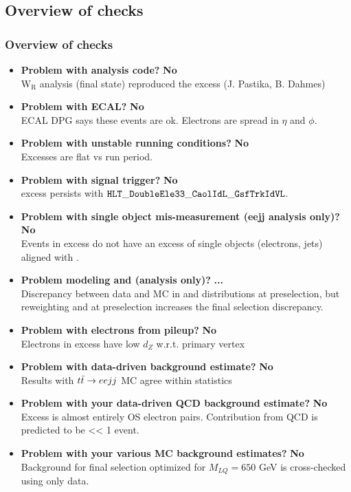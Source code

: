 \documentclass[bigger]{beamer}
\providecommand{\alert}[1]{\textbf{#1}}
\begin{document}
\subsection{Overview of checks}
\label{sec-7-3}
\begin{frame}
\frametitle{Overview of checks}
\label{sec-7-3-1}

\tiny
\begin{itemize}
\item \textbf{Problem with analysis code?} \alert{No} \\ 
$\text{W}_{\text{R}}$ analysis (\eejj final state) reproduced the excess (J. Pastika, B. Dahmes)
\item \textbf{Problem with ECAL?} \alert{No} \\
ECAL DPG says these events are ok.  Electrons are spread in $\eta$ and $\phi$.
\item \textbf{Problem with unstable running conditions?} \alert{No} \\ 
Excesses are flat vs run period.
\item \textbf{Problem with signal trigger?} \alert{No} \\ 
\eejj excess persists with ${\tt HLT\_DoubleEle33\_CaolIdL\_GsfTrkIdVL}$.
\item \textbf{Problem with single object mis-measurement (eejj analysis only)?} \alert{No} \\ 
Events in \eejj excess do not have an excess of single objects (electrons, jets) aligned with \met.
\item \textbf{Problem modeling \met and \mt (\enujj analysis only)?} \alert{...} \\
Discrepancy between data and MC in \met and \mt distributions at \enujj preselection, but reweighting
\mt and \met at preselection increases the final selection discrepancy.
\item \textbf{Problem with electrons from pileup?} \alert{No} \\ 
Electrons in excess have low $d_{Z}$ w.r.t. primary vertex
\item \textbf{Problem with data-driven \ttbar background estimate?} \alert{No} \\
Results with $t\bar{t} \rightarrow eejj$ MC agree within statistics
\item \textbf{Problem with your data-driven QCD background estimate?} \alert{No} \\
Excess is almost entirely OS electron pairs.  Contribution from QCD is predicted to be << 1 event.
\item \textbf{Problem with your various MC background estimates?} \alert{No} \\
Background for final selection optimized for $M_{LQ} = 650$ GeV is cross-checked using only data.
\end{itemize}
\end{frame}
\end{document}
